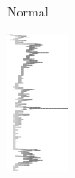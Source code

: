 \documentclass[nobib, nohyper, a4paper,openany]{tufte-book}
\begin{document}
\begin{figure}
\begin{subfigure}[b]{0.3\textwidth}
    \caption{Normal}
    \label{fig:map:mid}
  \end{subfigure}
  \begin{subfigure}[b]{0.3\textwidth}
    \includegraphics[width=\textwidth]{figures/treegraphs/midcount_minheight.png}

\end{subfigure}
\end{figure}
\end{document}
